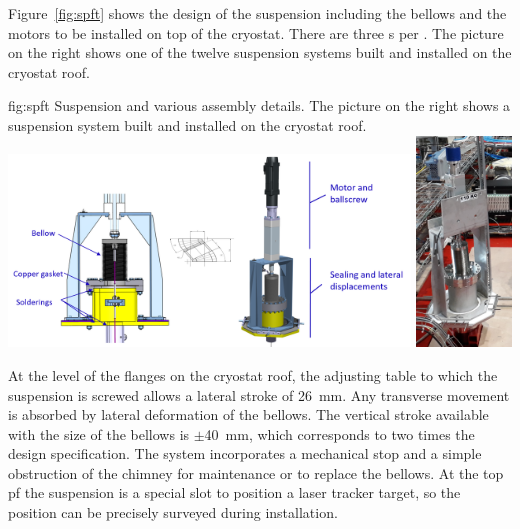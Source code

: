 Figure~\ref{fig:spft} shows the design of the suspension \fdth including the bellows and the motors to be installed on top of the cryostat. There are three \fdth{}s per . The picture on the right shows one of the twelve suspension systems built and installed on the  cryostat roof.

\begin{dunefigure}{fig:spft}
{Suspension \fdth and various assembly details. The picture on the right shows a suspension system built and installed on the  cryostat roof.}
\includegraphics[width=0.80\textwidth]{graphics/spft}
\includegraphics[width=0.19\textwidth]{graphics/spft-crp}
\end{dunefigure}
At the level of the flanges on the cryostat roof, the adjusting table to which the suspension \fdth is screwed allows a lateral stroke of \SI{26}{mm}. Any transverse movement is absorbed by lateral deformation of the bellows.
The vertical stroke available with the  size of the bellows is $\pm$\SI{40}{mm}, which corresponds to two times the design specification.
The system incorporates a  mechanical stop and a simple obstruction of the chimney for maintenance or to replace the bellows.
At the top pf the suspension \fdth is a special slot to position a laser tracker target,
so the \fdth position can be precisely surveyed during installation.

